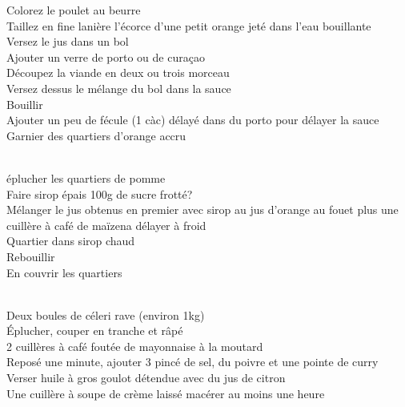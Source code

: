 \begin{minipage}[c]{\textwidth}
Colorez le poulet au beurre\\
Taillez en fine lanière l'écorce d'une petit orange jeté dans l'eau bouillante\\
Versez le jus dans un bol\\
Ajouter un verre de porto ou de curaçao\\
Découpez la viande en deux ou trois morceau\\
Versez dessus le mélange du bol dans la sauce\\
Bouillir\\
Ajouter un peu de fécule (1 càc) délayé dans du porto pour délayer la sauce\\
Garnier des quartiers d'orange accru\\
\\

\end{minipage}

\begin{minipage}[c]{\textwidth}
éplucher les quartiers de pomme\\
Faire sirop épais 100g de sucre frotté? \\
Mélanger le jus obtenus en premier avec sirop au jus d'orange au fouet plus une cuillère à café de maïzena délayer à froid\\
Quartier dans sirop chaud\\
Rebouillir\\
En couvrir les quartiers\\
\\

\end{minipage}

\begin{minipage}[c]{\textwidth}
Deux boules de céleri rave (environ 1kg)\\
Éplucher, couper en tranche et râpé\\
2 cuillères à café foutée de mayonnaise à la moutard\\
Reposé une minute, ajouter 3 pincé de sel, du poivre et une pointe de curry\\
Verser huile à gros goulot détendue avec du jus de citron\\
Une cuillère à soupe de crème laissé macérer au moins une heure\\
\\

\end{minipage}

